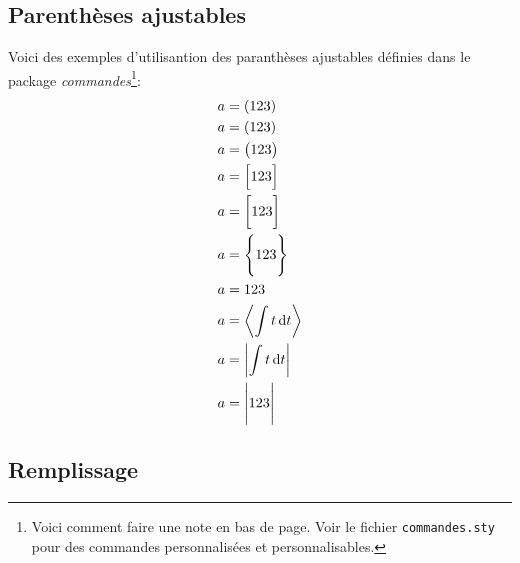 \subsection{Parenthèses ajustables}
Voici des exemples d'utilisantion des paranthèses ajustables définies dans le package \emph{commandes}\footnote{Voici comment faire une note en bas de page. Voir le fichier \texttt{commandes.sty} pour des commandes personnalisées et personnalisables.}:
\begin{align}
    a&=\p{123}            \\
    a&=\p[]{123}          \\
    a&=\p[big]{123}       \\
    a&=\pc[Big]{123}      \\
    a&=\pc[bigg]{123}     \\
    a&=\pa[Bigg]{123}     \\
    a&=\pa[none]{123}     \\
    a&=\moy{\int t\dd t}  \\
    a&=\norm{\int t\dd t} \\
    a&=\abs[Bigg]{123}    \\
\end{align}

\subsection{Remplissage}
\kant[8-10]

